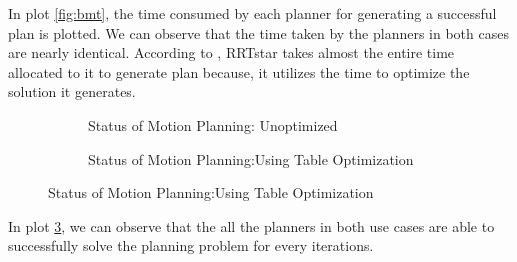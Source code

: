 In plot \ref{fig:bmt}, the time consumed by each planner for generating a successful plan is plotted. We can observe that the time taken by the planners in both cases are nearly identical. According to \citet{moll2015benchmarking-motion-planning-algorithms}, RRTstar takes almost the entire time allocated to it to generate plan because, it utilizes the time to optimize the solution it generates.

\begin{figure}[!htbp] %
	\centering
	\begin{subfigure}[b]{0.4\textwidth}
		\caption{Status of Motion Planning: Unoptimized}
		\label{fig:bms1}
	\end{subfigure}
	\begin{subfigure}[b]{0.4\textwidth}
		\caption{Status of Motion Planning:Using Table Optimization}
		\label{fig:bms2}
	\end{subfigure}	
	\caption{Status of Motion Planning:Using Table Optimization}
	\label{fig:bms}
\end{figure}
In plot \ref{fig:bms}, we can observe that the all the planners in both use cases are able to successfully solve the planning problem for every iterations. 

